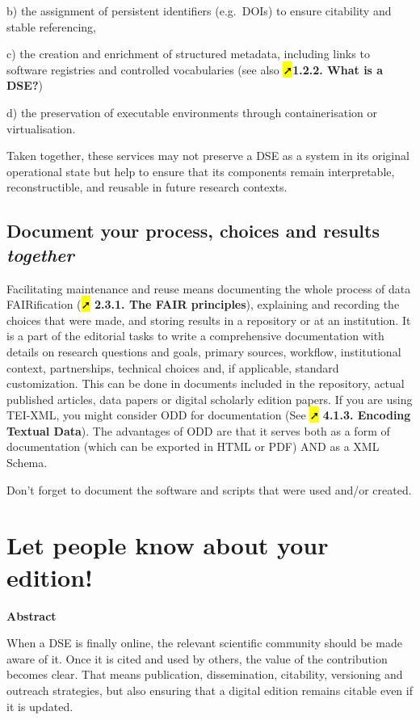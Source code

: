 \documentclass[
  letterpaper,
  DIV=11,
  numbers=noendperiod]{scrreprt}
\begin{document}
b) the assignment of persistent identifiers (e.g.~DOIs) to ensure
citability and stable referencing,

c) the creation and enrichment of structured metadata, including links
to software registries and controlled vocabularies (see also
\hl{➚}\textbf{1.2.2. What is a DSE?})

d) the preservation of executable environments through containerisation
or virtualisation.

Taken together, these services may not preserve a DSE as a system in its
original operational state but help to ensure that its components remain
interpretable, reconstructible, and reusable in future research
contexts.

\subsection{\texorpdfstring{Document your process, choices and results
\emph{together}}{Document your process, choices and results together}}\label{document-your-process-choices-and-results-together}

Facilitating maintenance and reuse means documenting the whole process
of data FAIRification (\hl{➚} \textbf{2.3.1. The FAIR principles}),
explaining and recording the choices that were made, and storing results
in a repository or at an institution. It is a part of the editorial
tasks to write a comprehensive documentation with details on research
questions and goals, primary sources, workflow, institutional context,
partnerships, technical choices and, if applicable, standard
customization. This can be done in documents included in the repository,
actual published articles, data papers or digital scholarly edition
papers. If you are using TEI-XML, you might consider ODD for
documentation (See \hl{➚} \textbf{4.1.3. Encoding Textual Data}). The
advantages of ODD are that it serves both as a form of documentation
(which can be exported in HTML or PDF) AND as a XML Schema.

Don't forget to document the software and scripts that were used and/or
created.

\section{Let people know about your
edition!}\label{let-people-know-about-your-edition}

\textbf{Abstract}

When a DSE is finally online, the relevant scientific community should
be made aware of it. Once it is cited and used by others, the value of
the contribution becomes clear. That means publication, dissemination,
citability, versioning and outreach strategies, but also ensuring that a
digital edition remains citable even if it is updated.
\end{document}
